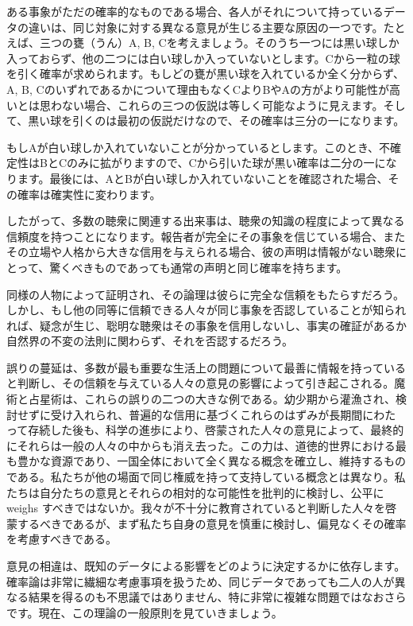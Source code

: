 \documentclass[a4paper,11pt,openany]{ltjsbook}
\begin{document}
ある事象がただの確率的なものである場合、各人がそれについて持っているデータの違いは、同じ対象に対する異なる意見が生じる主要な原因の一つです。たとえば、三つの甕（うん）A, B, Cを考えましょう。そのうち一つには黒い球しか入っておらず、他の二つには白い球しか入っていないとします。Cから一粒の球を引く確率が求められます。もしどの甕が黒い球を入れているか全く分からず、A, B, Cのいずれであるかについて理由もなくCよりBやAの方がより可能性が高いとは思わない場合、これらの三つの仮説は等しく可能なように見えます。そして、黒い球を引くのは最初の仮説だけなので、その確率は三分の一になります。

もしAが白い球しか入れていないことが分かっているとします。このとき、不確定性はBとCのみに拡がりますので、Cから引いた球が黒い確率は二分の一になります。最後には、AとBが白い球しか入れていないことを確認された場合、その確率は確実性に変わります。

したがって、多数の聴衆に関連する出来事は、聴衆の知識の程度によって異なる信頼度を持つことになります。報告者が完全にその事象を信じている場合、またその立場や人格から大きな信用を与えられる場合、彼の声明は情報がない聴衆にとって、驚くべきものであっても通常の声明と同じ確率を持ちます。

同様の人物によって証明され、その論理は彼らに完全な信頼をもたらすだろう。しかし、もし他の同等に信頼できる人々が同じ事象を否認していることが知られれば、疑念が生じ、聡明な聴衆はその事象を信用しないし、事実の確証があるか自然界の不変の法則に関わらず、それを否認するだろう。

誤りの蔓延は、多数が最も重要な生活上の問題について最善に情報を持っていると判断し、その信頼を与えている人々の意見の影響によって引き起こされる。魔術と占星術は、これらの誤りの二つの大きな例である。幼少期から灌漁され、検討せずに受け入れられ、普遍的な信用に基づくこれらのはずみが長期間にわたって存続した後も、科学の進歩により、啓蒙された人々の意見によって、最終的にそれらは一般の人々の中からも消え去った。この力は、道徳的世界における最も豊かな資源であり、一国全体において全く異なる概念を確立し、維持するものである。私たちが他の場面で同じ権威を持って支持している概念とは異なり。私たちは自分たちの意見とそれらの相対的な可能性を批判的に検討し、公平に weighs すべきではないか。我々が不十分に教育されていると判断した人々を啓蒙するべきであるが、まず私たち自身の意見を慎重に検討し、偏見なくその確率を考慮すべきである。

意見の相違は、既知のデータによる影響をどのように決定するかに依存します。確率論は非常に繊細な考慮事項を扱うため、同じデータであっても二人の人が異なる結果を得るのも不思議ではありません、特に非常に複雑な問題ではなおさらです。現在、この理論の一般原則を見ていきましょう。
\end{document}
